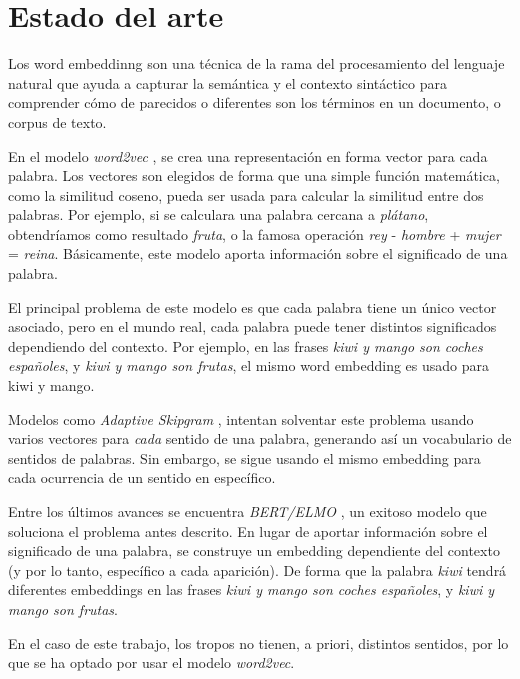 \chapter{Estado del arte}

Los word embeddinng son una técnica de la rama del procesamiento del lenguaje natural que ayuda a capturar la semántica y el contexto sintáctico para comprender cómo de parecidos o diferentes son los términos en un documento, o corpus de texto.

En el modelo \emph{word2vec} \cite{word2vec:1} \cite{word2vec:2}, se crea una representación en forma vector para cada palabra. Los vectores son elegidos de forma que una simple función matemática, como la similitud coseno, pueda ser usada para calcular la similitud entre dos palabras. Por ejemplo, si se calculara una palabra cercana a \emph{plátano}, obtendríamos como resultado \emph{fruta}, o la famosa operación \emph{rey} - \emph{hombre} + \emph{mujer} = \emph{reina}. Básicamente, este modelo aporta información sobre el significado de una palabra.

El principal problema de este modelo es que cada palabra tiene un único vector asociado, pero en el mundo real, cada palabra puede tener distintos significados dependiendo del contexto. Por ejemplo, en las frases \emph{kiwi y mango son coches españoles}, y \emph{kiwi y mango son frutas}, el mismo word embedding es usado para kiwi y mango.

Modelos como \emph{Adaptive Skipgram} \cite{adaptiveskipgram}, intentan solventar este problema usando  varios vectores para \emph{cada} sentido de una palabra, generando así un vocabulario de sentidos de palabras. Sin embargo, se sigue usando el mismo embedding para cada ocurrencia de un sentido en específico.

Entre los últimos avances se encuentra \emph{BERT/ELMO} \cite{bert}, un exitoso modelo que soluciona el problema antes descrito. En lugar de aportar información sobre el significado de una palabra, se construye un embedding dependiente del contexto (y por lo tanto, específico a cada aparición). De forma que la palabra \emph{kiwi} tendrá diferentes embeddings en las frases \emph{kiwi y mango son coches españoles}, y \emph{kiwi y mango son frutas}.

En el caso de este trabajo, los tropos no tienen, a priori, distintos sentidos, por lo que se ha optado por usar el modelo \emph{word2vec}.
